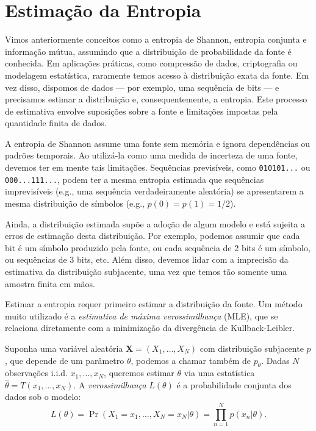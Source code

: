 \section{Estimação da Entropia}
\label{sec:estimacao-entropia}

Vimos anteriormente conceitos como a entropia de Shannon, entropia conjunta e
informação mútua, assumindo que a distribuição de probabilidade da fonte é
conhecida. Em aplicações práticas, como compressão de dados, criptografia ou
modelagem estatística, raramente temos acesso à distribuição exata da fonte. Em
vez disso, dispomos de dados --- por exemplo, uma sequência de
bits --- e precisamos estimar a distribuição e, consequentemente, a entropia.
Este processo de estimativa envolve suposições
sobre a fonte e limitações impostas pela quantidade finita de dados. 


A entropia de Shannon assume uma fonte sem memória e ignora dependências ou padrões temporais.
Ao utilizá-la como uma medida de incerteza de uma fonte, devemos ter em mente tais limitações. 
Sequências previsíveis, como \texttt{010101...} ou \texttt{000...111...}, 
podem ter a mesma entropia estimada que sequências imprevisíveis 
(e.g., uma sequência verdadeiramente aleatória) se apresentarem a mesma distribuição de símbolos 
(e.g., $p(0)=p(1)=1/2$).

Ainda, a distribuição estimada supõe a adoção de algum modelo e está sujeita a erros
de estimação desta distribuição. Por exemplo, podemos assumir que cada bit é um símbolo
produzido pela fonte, ou cada sequência de 2 bits é um símbolo, ou sequências de 3 bits, etc.
Além disso, devemos lidar com a imprecisão da estimativa da distribuição subjacente, uma vez
que temos tão somente uma amostra finita em mãos.

Estimar a entropia requer primeiro estimar a distribuição da fonte. Um método
muito utilizado é a \emph{estimativa de máxima verossimilhança} (MLE), que se relaciona
diretamente com a minimização da divergência de Kullback-Leibler. 

Suponha uma variável aleatória $\mathbf{X} = (X_1, \ldots, X_N)$ 
com distribuição subjacente $p$, que depende de um parâmetro $\theta$,
podemos a chamar também de $p_\theta$. 
Dadas $N$ observações i.i.d. $x_1, \ldots, x_N$, queremos estimar $\theta$ 
via uma  estatística $\hat{\theta} = T(x_1, \ldots, x_N)$. 
A \emph{verossimilhança} $L(\theta)$ é a probabilidade conjunta dos dados sob o modelo:
\begin{equation}
L(\theta) = \Pr(X_1 = x_1, \ldots, X_N = x_N | \theta) = \prod_{n=1}^N p(x_n | \theta).
\end{equation}

